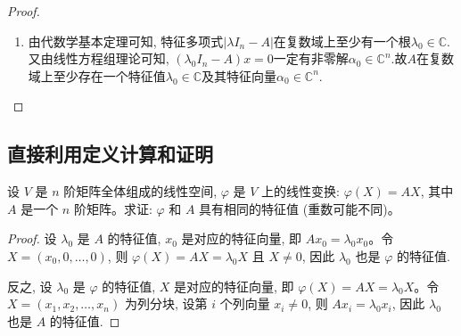 \documentclass[../../main.tex]{subfiles}%
\begin{document}
\begin{proof}
\begin{enumerate}
\begin{align*}
\begin{pmatrix}
    x_1\\
    x_2\\
    \vdots\\
    x_n\\
    \end{pmatrix}\\
    &=(e_1,e_2,\cdots ,e_n)\cdot\lambda_0I_n\begin{pmatrix}
    x_1\\
    x_2\\
    \vdots\\
    x_n\\
    \end{pmatrix}=\lambda_0(e_1,e_2,\cdots ,e_n)\begin{pmatrix}
    x_1\\
    x_2\\
    \vdots\\
    x_n\\
    \end{pmatrix}=\lambda_0\alpha_0.
    \end{align*}
故$\varphi$在$V$上至少存在一个特征值$\lambda_0\in\mathbb{C}$及其特征向量$\alpha_0\in V$.

\item 由代数学基本定理可知, 特征多项式\(|\lambda I_n - A|\)在复数域上至少有一个根\(\lambda_0\in \mathbb{C}\).
又由线性方程组理论可知, \((\lambda_0I_n - A)x = 0\)一定有非零解\(\alpha_0\in \mathbb{C}^n\).故$A$在复数域上至少存在一个特征值$\lambda_0\in\mathbb{C}$及其特征向量$\alpha_0\in\mathbb{C}^n$.
\end{enumerate}

\end{proof}

\subsection{直接利用定义计算和证明}

\begin{example}\label{example:由矩阵诱导的线性变换的特征值与其诱导矩阵相同}
设 $V$ 是 $n$ 阶矩阵全体组成的线性空间, $\varphi$ 是 $V$ 上的线性变换: $\varphi(X) = AX$, 其中 $A$ 是一个 $n$ 阶矩阵。求证: $\varphi$ 和 $A$ 具有相同的特征值 (重数可能不同)。
\end{example}
\begin{proof}

设 $\lambda_0$ 是 $A$ 的特征值, $x_0$ 是对应的特征向量, 即 $Ax_0 = \lambda_0 x_0$。令 $X = (x_0, 0, \ldots, 0)$, 则 $\varphi(X) = AX = \lambda_0 X$ 且 $X \neq 0$, 因此 $\lambda_0$ 也是 $\varphi$ 的特征值.

反之, 设 $\lambda_0$ 是 $\varphi$ 的特征值, $X$ 是对应的特征向量, 即 $\varphi(X) = AX = \lambda_0 X$。令 $X = (x_1, x_2, \ldots, x_n)$ 为列分块, 设第 $i$ 个列向量 $x_i \neq 0$, 则 $Ax_i = \lambda_0 x_i$, 因此 $\lambda_0$ 也是 $A$ 的特征值.

\end{proof}
\end{document}
